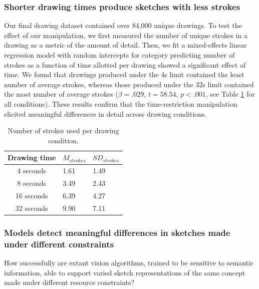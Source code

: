 \documentclass[10pt,letterpaper]{article}
\begin{document}
\subsubsection{Shorter drawing times produce sketches with less strokes}
Our final drawing dataset contained over 84,000 unique drawings. 
To test the effect of our manipulation, we first measured the number of unique strokes in a drawing as a metric of the amount of detail.
Then, we fit a mixed-effects linear regression model with random intercepts for category predicting number of strokes as a function of time allotted per drawing showed a significant effect of time.
We found that drawings produced under the 4s limit contained the least number of average strokes, whereas those produced under the 32s limit contained the most number of average strokes ($\beta=.029$, $t=58.54$, $p<.001$, see Table \ref{tab:strokes} for all conditions). 
These results confirm that the time-restriction manipulation elicited meaningful differences in detail across drawing conditions.
\vspace{-.8em}
\begin{table}[ht!]
\centering
    \begin{tabular}{c|l l}
        Drawing time & $M_{strokes}$ & $SD_{strokes}$\\
         \toprule
        4 seconds & 1.61 & 1.49\\
        \vspace{-1mm}
        8 seconds & 3.49 & 2.43\\
        16 seconds & 6.39 & 4.27\\
        32 seconds & 9.90 & 7.11\\
        \bottomrule 
    \end{tabular}
    \vspace{-0.5em}
    \caption{Number of strokes used per drawing condition. 
    }
    \label{tab:strokes}
    \vspace{-2em}
\end{table}

\subsubsection{Models detect meaningful differences in sketches made under different constraints}
How successfully are extant vision algorithms, trained to be sensitive to semantic information, able to support varied sketch representations of the same concept made under different resource constraints? 
\end{document}
